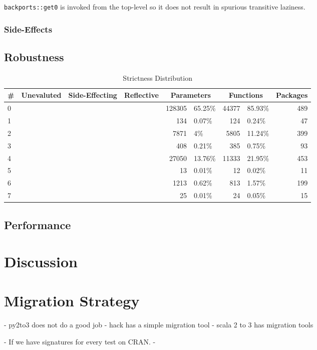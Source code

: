 \documentclass[screen,acmsmall]{acmart}
\newcommand{\xmark}{\color{red} \ding{55}}
\newcommand{\cmark}{\color{green} \ding{51}}
\newcommand{\code}[1]{\lstinline[style=R]|#1|\xspace}
\begin{document}
\code{backports::get0} is invoked from the top-level so it does not result in
spurious transitive laziness.

\subsubsection{Side-Effects}



\subsection{Robustness}

\begin{table}
  \vspace{-3mm}
  \small
  \caption{Strictness Distribution} \label{table:strictdist}
  \centering
  \begin{tabular}{lcccr|lr|lr}
    \toprule
    \#&\bf Unevaluted & \bf Side-Effecting & \bf Reflective & \multicolumn{2}{c}{\textbf{Parameters}} & \multicolumn{2}{c}{\textbf{Functions}}& \bf Packages\\
    \midrule
    0&\xmark{}&\xmark{}&\xmark{}&128305&65.25\%&44377&85.93\%&489\\
    1&\xmark{}&\xmark{}&\cmark{}&134&0.07\%&124&0.24\%&47\\
    2&\xmark{}&\cmark{}&\xmark{}&7871&4\%&5805&11.24\%&399\\
    3&\xmark{}&\cmark{}&\cmark{}&408&0.21\%&385&0.75\%&93\\
    4&\cmark{}&\xmark{}&\xmark{}&27050&13.76\%&11333&21.95\%&453\\
    5&\cmark{}&\xmark{}&\cmark{}&13&0.01\%&12&0.02\%&11\\
    6&\cmark{}&\cmark{}&\xmark{}&1213&0.62\%&813&1.57\%&199\\
    7&\cmark{}&\cmark{}&\cmark{}&25&0.01\%&24&0.05\%&15\\
    \bottomrule
  \end{tabular}
\end{table}

\subsection{Performance}

\section{Discussion}



\section{Migration Strategy}
- py2to3 does not do a good job
- hack has a simple migration tool
- scala 2 to 3 has migration tools

- If we have signatures for every test on CRAN.
- 



\end{document}
